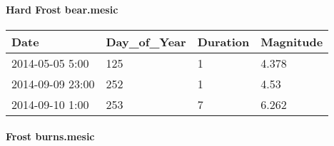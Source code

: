 \documentclass[
]{article}
\begin{document}
\hypertarget{hard-frost-bear.mesic}{%
\paragraph{Hard Frost bear.mesic}\label{hard-frost-bear.mesic}}

\begin{tabular}{l|l|l|l}
\hline
Date & Day\_of\_Year & Duration & Magnitude\\
\hline
2014-05-05 5:00 & 125 & 1 & 4.378\\
\hline
2014-09-09 23:00 & 252 & 1 & 4.53\\
\hline
2014-09-10 1:00 & 253 & 7 & 6.262\\
\hline
\end{tabular}

\hypertarget{frost-burns.mesic}{%
\paragraph{Frost burns.mesic}\label{frost-burns.mesic}}
\end{document}
